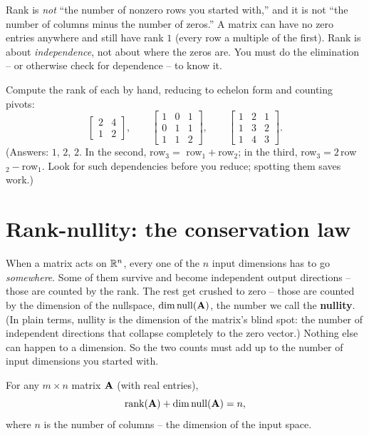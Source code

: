 \begin{trapbox}
Rank is \emph{not} ``the number of nonzero rows you started with,'' and it is not
``the number of columns minus the number of zeros.'' A matrix can have no zero
entries anywhere and still have rank $1$ (every row a multiple of the first).
Rank is about \emph{independence}, not about where the zeros are. You must do the
elimination -- or otherwise check for dependence -- to know it.
\end{trapbox}

\begin{labbox}
Compute the rank of each by hand, reducing to echelon form and counting pivots:
\[
  \begin{bmatrix} 2 & 4 \\ 1 & 2 \end{bmatrix}, \qquad
  \begin{bmatrix} 1 & 0 & 1 \\ 0 & 1 & 1 \\ 1 & 1 & 2 \end{bmatrix}, \qquad
  \begin{bmatrix} 1 & 2 & 1 \\ 1 & 3 & 2 \\ 1 & 4 & 3 \end{bmatrix}.
\]
(Answers: $1$, $2$, $2$. In the second, row$_3 = $ row$_1+$row$_2$; in the third,
row$_3 = 2\,$row$_2 - $row$_1$. Look for such dependencies before you reduce;
spotting them saves work.)
\end{labbox}

\section{Rank-nullity: the conservation law}

When a matrix acts on $\mathbb{R}^n$, every one of the $n$ input dimensions has to go \emph{somewhere}.
Some of them survive and become independent output directions -- those are
counted by the rank. The rest get crushed to zero -- those are counted by the
dimension of the nullspace, $\operatorname{dim}\operatorname{null}(\mathbf{A})$, the number we call the
\textbf{nullity}. (In plain terms, nullity is the dimension of the matrix's blind
spot: the number of independent directions that collapse completely to the zero
vector.) Nothing else can happen to a dimension. So the two counts must add up
to the number of input dimensions you started with.

\begin{theorem}\label{ch16:rank-nullity}
For any $m \times n$ matrix $\mathbf{A}$ (with real entries),
\[
  \operatorname{rank}(\mathbf{A}) + \operatorname{dim}\operatorname{null}(\mathbf{A}) = n,
\]
where $n$ is the number of columns -- the dimension of the input space.
\end{theorem}

